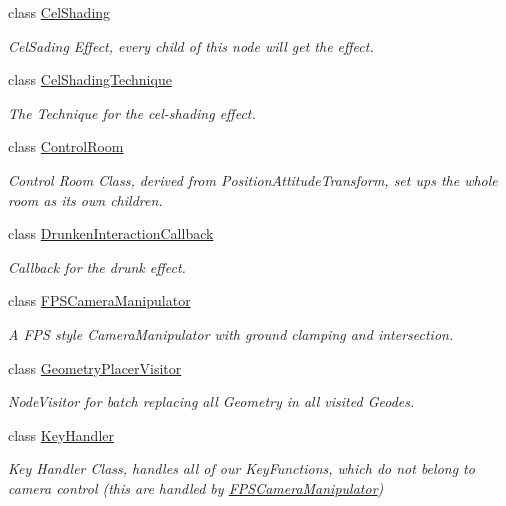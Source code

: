 \begin{DoxyCompactItemize}
class \hyperlink{classbrtr_1_1_cel_shading}{Cel\+Shading}
\begin{DoxyCompactList}\small\item\em Cel\+Sading Effect, every child of this node will get the effect. \end{DoxyCompactList}\item 
class \hyperlink{classbrtr_1_1_cel_shading_technique}{Cel\+Shading\+Technique}
\begin{DoxyCompactList}\small\item\em The Technique for the cel-\/shading effect. \end{DoxyCompactList}\item 
class \hyperlink{classbrtr_1_1_control_room}{Control\+Room}
\begin{DoxyCompactList}\small\item\em Control Room Class, derived from Position\+Attitude\+Transform, set ups the whole room as its own children. \end{DoxyCompactList}\item 
class \hyperlink{classbrtr_1_1_drunken_interaction_callback}{Drunken\+Interaction\+Callback}
\begin{DoxyCompactList}\small\item\em Callback for the drunk effect. \end{DoxyCompactList}\item 
class \hyperlink{classbrtr_1_1_f_p_s_camera_manipulator}{F\+P\+S\+Camera\+Manipulator}
\begin{DoxyCompactList}\small\item\em A F\+P\+S style Camera\+Manipulator with ground clamping and intersection. \end{DoxyCompactList}\item 
class \hyperlink{classbrtr_1_1_geometry_placer_visitor}{Geometry\+Placer\+Visitor}
\begin{DoxyCompactList}\small\item\em Node\+Visitor for batch replacing all Geometry in all visited Geodes. \end{DoxyCompactList}\item 
class \hyperlink{classbrtr_1_1_key_handler}{Key\+Handler}
\begin{DoxyCompactList}\small\item\em Key Handler Class, handles all of our Key\+Functions, which do not belong to camera control (this are handled by \hyperlink{classbrtr_1_1_f_p_s_camera_manipulator}{F\+P\+S\+Camera\+Manipulator}) \end{DoxyCompactList}\item 

\end{DoxyCompactItemize}
